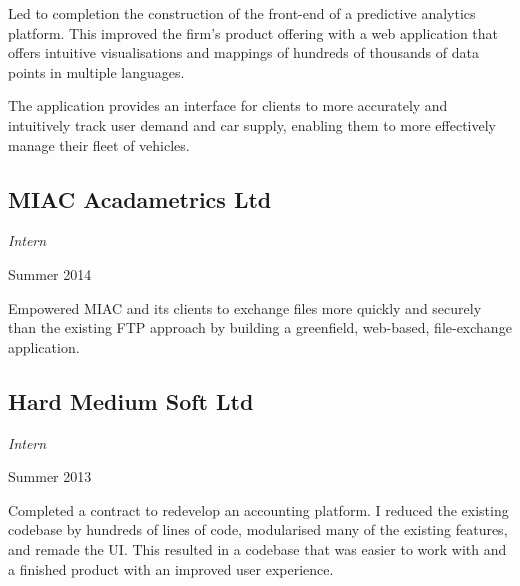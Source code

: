 Led to completion the construction of the front-end of a predictive analytics
platform. This improved the firm's product offering with a web application that
offers intuitive visualisations and mappings of hundreds of thousands of data
points in multiple languages.

The application provides an interface for clients to more accurately and
intuitively track user demand and car supply, enabling them to more effectively
manage their fleet of vehicles.

\subsection*{MIAC Acadametrics Ltd}
\noindent\begin{minipage}[b]{0.5\textwidth}
  \flushleft
  \emph{Intern}
\end{minipage}
\noindent\begin{minipage}[b]{0.5\textwidth}
  \flushright
  Summer 2014
\end{minipage}

Empowered MIAC and its clients to exchange files more quickly and securely than
the existing FTP approach by building a greenfield, web-based, file-exchange
application.

\subsection*{Hard Medium Soft Ltd}
\noindent\begin{minipage}[b]{0.5\textwidth}
  \flushleft
  \emph{Intern}
\end{minipage}
\noindent\begin{minipage}[b]{0.5\textwidth}
  \flushright
  Summer 2013
\end{minipage}

Completed a contract to redevelop an accounting platform. I reduced the existing
codebase by hundreds of lines of code, modularised many of the existing
features, and remade the UI. This resulted in a codebase that was easier to work
with and a finished product with an improved user experience.

